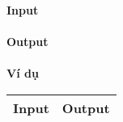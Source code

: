 

\textbf{Input}
\\

\\

\textbf{Output}
\\

\\

\textbf{Ví dụ}
\begin{table}[h!]
    \begin{center}
        \begin{tabular}{|p{7cm}|p{5cm}|}
            \hline
            \textbf{Input} & \textbf{Output} \\ 
            \hline

            \hline
        \end{tabular}
    \end{center}
\end{table}


